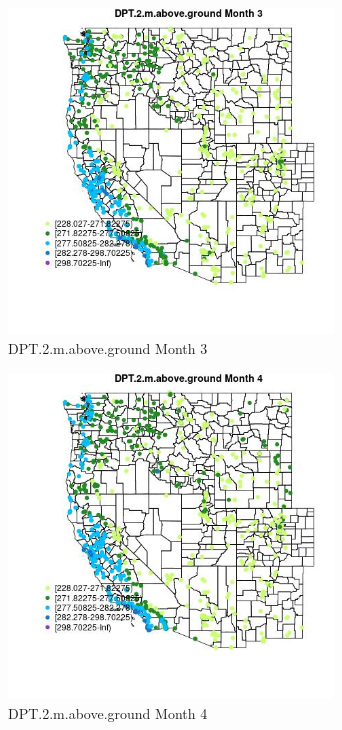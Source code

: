 \begin{figure} 
\centering  
\includegraphics[width=0.77\textwidth]{Code_Outputs/Report_ML_input_PM25_Step4_part_f_de_duplicated_aves_prioritize_24hr_obswNAs_MapObsMo3DPT2maboveground.jpg} 
\caption{\label{fig:Report_ML_input_PM25_Step4_part_f_de_duplicated_aves_prioritize_24hr_obswNAsMapObsMo3DPT2maboveground}DPT.2.m.above.ground Month 3} 
\end{figure} 
 

\clearpage 

\begin{figure} 
\centering  
\includegraphics[width=0.77\textwidth]{Code_Outputs/Report_ML_input_PM25_Step4_part_f_de_duplicated_aves_prioritize_24hr_obswNAs_MapObsMo4DPT2maboveground.jpg} 
\caption{\label{fig:Report_ML_input_PM25_Step4_part_f_de_duplicated_aves_prioritize_24hr_obswNAsMapObsMo4DPT2maboveground}DPT.2.m.above.ground Month 4} 
\end{figure} 
 

